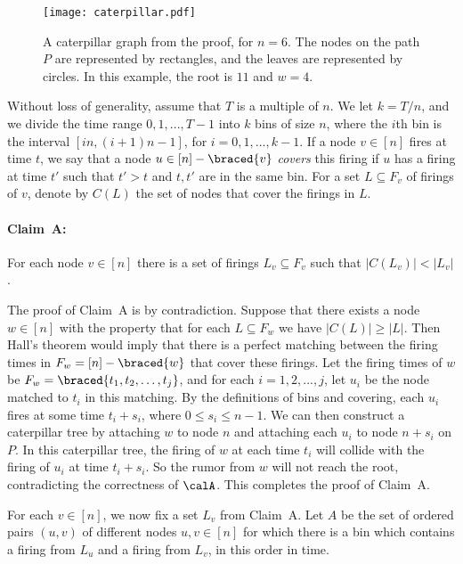 \begin{figure}[ht]
\begin{center}
\texttt{[image: caterpillar.pdf]}
\caption{A caterpillar graph from the proof, for $n=6$. 
The nodes on the path $P$ are represented by 
rectangles, and the leaves are represented by circles. In this example,
the root is $11$ and $w = 4$.
}
\label{fig: caterpillar}
\end{center}
\end{figure}


Without loss of generality, assume that $T$ is a multiple of $n$.
We let $k = T/n$, and we divide the time range $0,1,...,T-1$ into $k$
bins of size $n$, where the $i$th bin is the interval $[in,(i+1)n-1]$, for $i = 0,1,...,k-1$.
If a node $v\in [n]$ fires at time $t$, we say that a node $u\in [n]-\braced{v}$ 
\emph{covers} this firing if $u$ has a firing at time $t'$ such that $t' > t$ and $t,t'$ are
in the same bin.
For a set $L\subseteq F_v$ of firings of $v$, denote by 
$C(L)$ the set of nodes that cover the firings in $L$.

\paragraph{Claim~A:} For each node $v\in [n]$ there is a set of firings $L_v\subseteq F_v$
such that $|C(L_v)| < |L_v|$.

\smallskip

The proof of Claim~A is by contradiction. Suppose that there exists a node $w\in [n]$
with the property that for each $L\subseteq F_w$ we have $|C(L)|\ge |L|$.
Then Hall's theorem would imply that there is a perfect matching between the firing times 
in $F_w = [n]-\braced{w}$ that cover these firings.
Let the firing times of  $w$ be $F_w = \braced{ t_1, t_2, \dots, t_j}$,
and for each $i = 1,2,...,j$, let $u_i$ be the node matched to $t_i$ in this matching.
By the definitions of bins and covering, each $u_i$
fires at some time $t_i+s_i$, where $0 \leq s_i \leq n-1$.  We can then construct
a caterpillar tree by
attaching $w$ to node $n$ and attaching each $u_i$ to node $n+s_i$ on $P$. 
In this caterpillar tree, the firing of $w$ at each time $t_i$ will collide with
the firing of $u_i$ at time $t_i+s_i$. So the rumor from $w$ will not
reach the root, contradicting the correctness of $\calA$. 
This completes the proof of Claim~A.

\smallskip

For each $v\in [n]$, we now fix a set $L_v$ from Claim~A.
Let $A$ be the set of ordered pairs $(u,v)$ of different nodes $u,v\in [n]$
for which
there is a bin which contains a firing from $L_u$ and a firing from $L_v$,
in this order in time.

